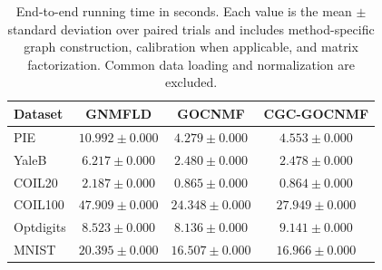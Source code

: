 \begin{table}[t]
\centering
\caption{End-to-end running time in seconds. Each value is the mean $\pm$ standard deviation over paired trials and includes method-specific graph construction, calibration when applicable, and matrix factorization. Common data loading and normalization are excluded.}\label{tab:end_to_end_time}
\setlength{\tabcolsep}{6pt}
\begin{tabular}{lccc}
\toprule
Dataset & GNMFLD & GOCNMF & CGC-GOCNMF \\
\midrule
PIE & $10.992\pm0.000$ & $4.279\pm0.000$ & $4.553\pm0.000$ \\
YaleB & $6.217\pm0.000$ & $2.480\pm0.000$ & $2.478\pm0.000$ \\
COIL20 & $2.187\pm0.000$ & $0.865\pm0.000$ & $0.864\pm0.000$ \\
COIL100 & $47.909\pm0.000$ & $24.348\pm0.000$ & $27.949\pm0.000$ \\
Optdigits & $8.523\pm0.000$ & $8.136\pm0.000$ & $9.141\pm0.000$ \\
MNIST & $20.395\pm0.000$ & $16.507\pm0.000$ & $16.966\pm0.000$ \\
\bottomrule
\end{tabular}
\end{table}

